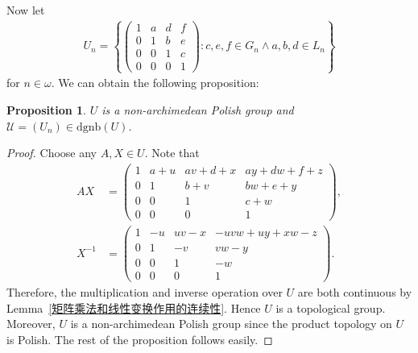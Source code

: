 \documentclass[11pt]{amsart}
\newtheorem{proposition}[theorem]{Proposition}
\theoremstyle{definition}
\theoremstyle{remark}
\numberwithin{equation}{section}
\def\dgnb{{\mathrm{dgnb}}}
\begin{document}
Now let
\begin{align*}
    U_n=\left\{
        \begin{pmatrix}
            1 & a & d & f\\
            0 & 1 & b & e\\
            0 & 0 & 1 & c\\
            0 & 0 & 0 & 1
        \end{pmatrix}:c,e,f\in G_n\wedge a,b,d\in L_n\right\}
\end{align*}
for $n\in\omega$. We can obtain the following proposition:
\begin{proposition}\label{U是non-archimedean Polish群}
    $U$ is a non-archimedean Polish group and $\mathcal{U}=(U_n)\in\dgnb(U)$.
\end{proposition}

\begin{proof}%
    Choose any $A,X\in U$. Note that
    \begin{align*}
        AX&=\begin{pmatrix}
            1 & a+u & a v + d + x & a y + d w + f + z\\
            0 & 1 & b+v & b w + e + y\\
            0 & 0 & 1 & c + w\\
            0 & 0 & 0 & 1
        \end{pmatrix},\\
        X^{-1}&=\begin{pmatrix}
            1 & -u & u v - x & -u v w + u y + x w - z\\
            0 & 1 & -v & v w - y\\
            0 & 0 & 1 & -w\\
            0 & 0 & 0 & 1
        \end{pmatrix}.
    \end{align*}
Therefore, the multiplication and inverse operation over $U$ are both continuous by Lemma~\ref{矩阵乘法和线性变换作用的连续性}. Hence $U$ is a topological group.
Moreover, $U$ is a non-archimedean Polish group since the product topology on $U$ is Polish. The rest of the proposition follows easily.
\end{proof}
\end{document}
